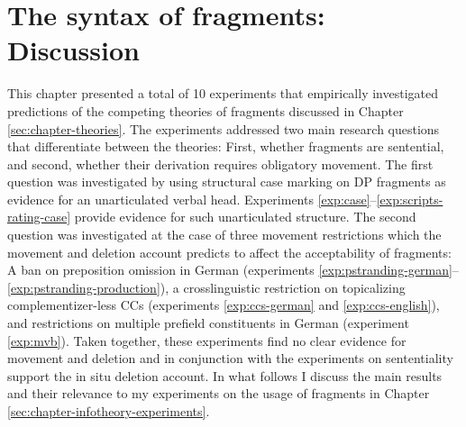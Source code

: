 \section{The syntax of fragments: Discussion}\label{sec:syntax-gdiscussion}
This chapter presented a total of 10 experiments that empirically investigated predictions of the competing theories of fragments discussed in Chapter \ref{sec:chapter-theories}. The experiments addressed two main research questions that differentiate between the theories: First, whether fragments are sentential, and second, whether their derivation requires obligatory movement. The first question was investigated by using structural case marking on DP fragments as evidence for an unarticulated verbal head. Experiments \ref{exp:case}--\ref{exp:scripts-rating-case} provide evidence for such unarticulated structure. The second question was investigated at the case of three movement restrictions which the movement and deletion account predicts to affect the acceptability of fragments: A ban on preposition omission in German (experiments \ref{exp:pstranding-german}--\ref{exp:pstranding-production}), a crosslinguistic restriction on topicalizing complementizer-less CCs (experiments \ref{exp:ccs-german} and \ref{exp:ccs-english}), and restrictions on multiple prefield constituents in German (experiment \ref{exp:mvb}). Taken together, these experiments find no clear evidence for movement and deletion and in conjunction with the experiments on sententiality support the in situ deletion account. In what follows I  discuss the main results and their relevance to my experiments on the usage of fragments in Chapter \ref{sec:chapter-infotheory-experiments}.

